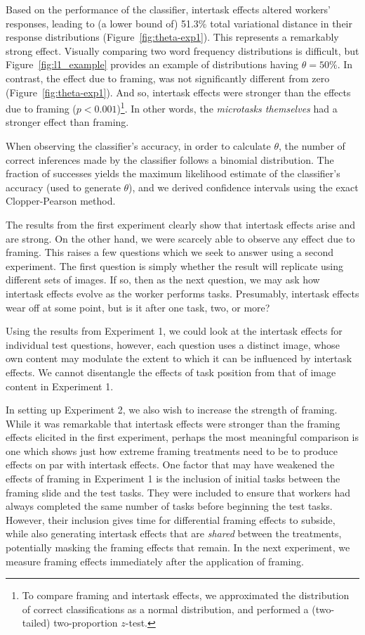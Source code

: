 \documentclass{sigchi}
\begin{document}
Based on the performance of the classifier, intertask effects altered
workers' responses, leading to (a lower bound of) 51.3\% total variational 
distance in their response distributions (Figure~\ref{fig:theta-exp1}).  
This represents a remarkably strong effect.
Visually comparing two word frequency distributions is difficult, but 
Figure~\ref{fig:l1_example} provides an example of distributions having 
$\theta = 50\%$.  In contrast, the effect due to framing, was not 
significantly different from zero (Figure~\ref{fig:theta-exp1}).
And so, intertask effects were stronger than the effects due to 
framing ($p<0.001$)\footnote{
  To compare framing and intertask 
  effects, we approximated the distribution
  of correct classifications as a normal distribution, and performed
  a (two-tailed) two-proportion $z$-test.
}.
In other words, the \textit{microtasks themselves} had a stronger effect 
than framing.

When observing the classifier's accuracy, in order to calculate $\theta$,
the number of correct inferences made by the classifier follows a binomial 
distribution.  The fraction of successes yields the maximum likelihood
estimate of the classifier's accuracy (used to generate $\theta$), 
and we derived confidence intervals using the exact Clopper-Pearson method.

The results from the first experiment clearly show that intertask effects 
arise and are strong.  On the other hand, we were scarcely able to observe
any effect due to framing.  This raises a few questions which we seek
to answer using a second experiment.  The first question is simply whether
the result will replicate using different sets of images.  
If so, then as the next question, we may ask how intertask effects evolve
as the worker performs tasks.  Presumably, intertask effects wear off at 
some point, but is it after one task, two, or more?  

Using the results from Experiment 1, 
we could look at the intertask effects for individual test questions, 
however, each question uses a distinct image, whose own content may
modulate the extent to which it can be influenced by intertask effects.
We cannot disentangle the effects of task position from that of image 
content in Experiment 1.

In setting up Experiment 2, we also wish to increase the strength of 
framing.  While it was remarkable that intertask effects were stronger 
than the framing effects elicited in the first experiment, perhaps the 
most meaningful comparison is one which shows just how extreme framing 
treatments need to be to produce effects on par with intertask effects.  
One factor that may have weakened the effects of framing in Experiment 1 
is the inclusion of initial tasks between the framing slide and the test 
tasks. They were included to ensure that workers had always completed the
same number of tasks before beginning the test tasks.  However, their 
inclusion gives time for differential framing effects to 
subside, while also generating intertask effects that are 
\textit{shared} between the treatments, potentially masking the framing 
effects that remain.  In the next experiment, we measure framing effects 
immediately after the application of framing.
\end{document}
